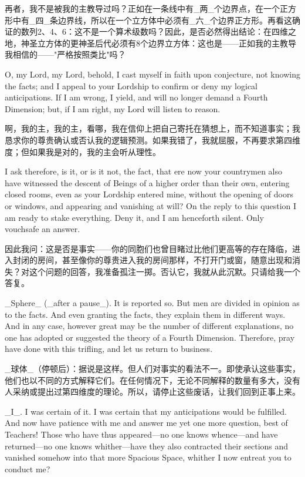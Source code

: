 \documentclass[12pt,UTF8]{ctexbook}
\begin{document}
再者，我不是被我的主教导过吗？正如在一条线中有\_两\_个边界点，在一个正方形中有\_四\_条边界线，所以在一个立方体中必须有\_六\_个边界正方形。再看这确证的数列2、4、6：这不是一个算术级数吗？因此，是否必然得出结论：在四维之地，神圣立方体的更神圣后代必须有8个边界立方体：这也是——正如我的主教导我相信的——"严格按照类比"吗？

O, my Lord, my Lord, behold, I cast myself in faith upon conjecture, not knowing the facts; and I appeal to your Lordship to confirm or deny my logical anticipations. If I am wrong, I yield, and will no longer demand a Fourth Dimension; but, if I am right, my Lord will listen to reason.

啊，我的主，我的主，看哪，我在信仰上把自己寄托在猜想上，而不知道事实；我恳求你的尊贵确认或否认我的逻辑预测。如果我错了，我就屈服，不再要求第四维度；但如果我是对的，我的主会听从理性。

I ask therefore, is it, or is it not, the fact, that ere now your countrymen also have witnessed the descent of Beings of a higher order than their own, entering closed rooms, even as your Lordship entered mine, without the opening of doors or windows, and appearing and vanishing at will? On the reply to this question I am ready to stake everything. Deny it, and I am henceforth silent. Only vouchsafe an answer.

因此我问：这是否是事实——你的同胞们也曾目睹过比他们更高等的存在降临，进入封闭的房间，甚至像你的尊贵进入我的房间那样，不打开门或窗，随意出现和消失？对这个问题的回答，我准备孤注一掷。否认它，我就从此沉默。只请给我一个答复。

\_Sphere\_ (\_after a pause\_). It is reported so. But men are divided in opinion as to the facts. And even granting the facts, they explain them in different ways. And in any case, however great may be the number of different explanations, no one has adopted or suggested the theory of a Fourth Dimension. Therefore, pray have done with this trifling, and let us return to business.

\_球体\_（停顿后）：据说是这样。但人们对事实的看法不一。即使承认这些事实，他们也以不同的方式解释它们。在任何情况下，无论不同解释的数量有多大，没有人采纳或提出过第四维度的理论。所以，请停止这些废话，让我们回到正事上来。

\_I\_. I was certain of it. I was certain that my anticipations would be fulfilled. And now have patience with me and answer me yet one more question, best of Teachers! Those who have thus appeared---no one knows whence---and have returned---no one knows whither---have they also contracted their sections and vanished somehow into that more Spacious Space, whither I now entreat you to conduct me?
\end{document}
